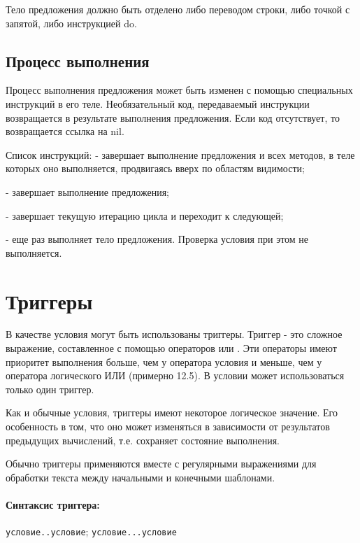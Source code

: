 Тело предложения должно быть отделено либо переводом строки, либо точкой с запятой, либо инструкцией do. 

\subsection{Процесс выполнения}

Процесс выполнения предложения может быть изменен с помощью специальных инструкций в его теле. Необязательный код, передаваемый инструкции возвращается в результате выполнения предложения. Если код отсутствует, то возвращается ссылка на nil.

\begin{keylist}{Список инструкций:}  
   - завершает выполнение предложения и всех методов, в теле которых оно выполняется, продвигаясь вверх по областям видимости;
  
   - завершает выполнение предложения;
  
   - завершает текущую итерацию цикла и переходит к следующей;
  
   - еще раз выполняет тело предложения. Проверка условия при этом не выполняется.
\end{keylist}

\section{Триггеры}

В качестве условия могут быть использованы триггеры. Триггер - это сложное выражение, составленное с помощью операторов  или  . Эти операторы имеют приоритет выполнения больше, чем у оператора условия и меньше, чем у оператора логического ИЛИ (примерно 12.5). В условии может использоваться только один триггер. 

Как и обычные условия, триггеры имеют некоторое логическое значение. Его особенность в том, что оно может изменяться в зависимости от результатов предыдущих вычислений, т.е. сохраняет состояние выполнения.

Обычно триггеры применяются вместе с регулярными выражениями для обработки текста между начальными и конечными шаблонами.

\paragraph*{Синтаксис триггера:} \verb!условие..условие!; \verb!условие...условие!

